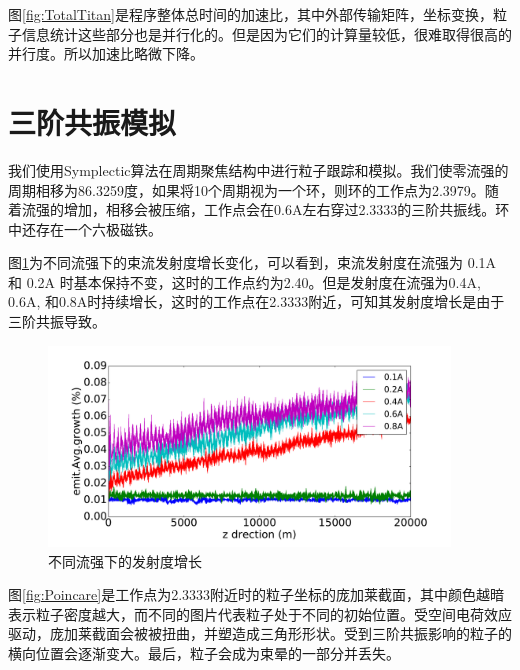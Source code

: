 图\ref{fig:TotalTitan}是程序整体总时间的加速比，其中外部传输矩阵，坐标变换，粒子信息统计这些部分也是并行化的。但是因为它们的计算量较低，很难取得很高的并行度。所以加速比略微下降。

\section{三阶共振模拟}            \label{section:3rd_order_simulation}
我们使用Symplectic算法在周期聚焦结构中进行粒子跟踪和模拟。我们使零流强的周期相移为86.3259度，如果将10个周期视为一个环，则环的工作点为2.3979。随着流强的增加，相移会被压缩，工作点会在0.6A左右穿过2.3333的三阶共振线。环中还存在一个六极磁铁。

图\ref{fig:emitGrowthCompare}为不同流强下的束流发射度增长变化，可以看到，束流发射度在流强为 0.1A 和 0.2A 时基本保持不变，这时的工作点约为2.40。但是发射度在流强为0.4A, 0.6A, 和0.8A时持续增长，这时的工作点在2.3333附近，可知其发射度增长是由于三阶共振导致。

\begin{figure}[!htb]
    \centering
    \includegraphics[width=0.95\textwidth]{Img/SymplecticEmitGrowthCompare.pdf}
    \caption{不同流强下的发射度增长}
    \label{fig:emitGrowthCompare}
\end{figure}

图\ref{fig:Poincare}是工作点为2.3333附近时的粒子坐标的庞加莱截面，其中颜色越暗表示粒子密度越大，而不同的图片代表粒子处于不同的初始位置。受空间电荷效应驱动，庞加莱截面会被被扭曲，并塑造成三角形形状。受到三阶共振影响的粒子的横向位置会逐渐变大。最后，粒子会成为束晕的一部分并丢失。


